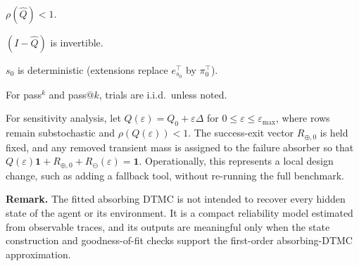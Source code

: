 \begin{assumption}[Transience]\label{A:trans}
$\rho(\hat Q)<1$.
\end{assumption}
\begin{assumption}[Invertibility]\label{A:inv}
$(I-\hat Q)$ is invertible.
\end{assumption}
\begin{assumption}\label{A:init}
$s_0$ is deterministic (extensions replace $e_{s_0}^\top$ by
$\pi_0^\top$).
\end{assumption}
\begin{assumption}[I.i.d.\ replications]\label{A:iid}
For pass$^k$ and pass$@k$, trials are i.i.d.\ unless noted.
\end{assumption}

\begin{definition}\label{def:perturb}
For sensitivity analysis, let
$Q(\varepsilon)=Q_0+\varepsilon\Delta$ for
$0\le\varepsilon\le\varepsilon_{\max}$, where rows remain
substochastic and $\rho(Q(\varepsilon))<1$. The success-exit vector
$R_{\oplus,0}$ is held fixed, and any removed transient mass is
assigned to the failure absorber so that
$Q(\varepsilon)\mathbf{1}+R_{\oplus,0}+R_{\ominus}(\varepsilon)
=\mathbf{1}$. Operationally, this represents a local design change,
such as adding a fallback tool, without re-running the full benchmark.
\end{definition}

\noindent\textbf{Remark.}
The fitted absorbing DTMC is not intended to recover every hidden state
of the agent or its environment. It is a compact reliability model
estimated from observable traces, and its outputs are meaningful only
when the state construction and goodness-of-fit checks support the
first-order absorbing-DTMC approximation.

